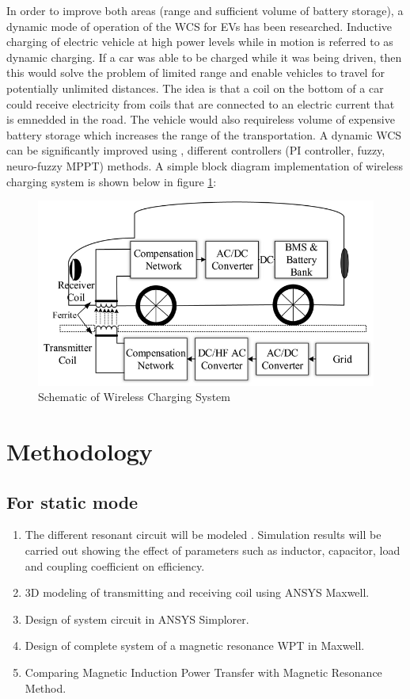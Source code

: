 \documentclass[12pt]{article}
\begin{document}
In order to improve both areas (range and sufficient volume of battery storage), a dynamic mode of operation of the WCS for EVs has been researched. Inductive charging of electric vehicle at high power levels while in motion is referred to as dynamic charging. If a car was able to be charged while it was being driven, then this would solve the problem of limited range and enable vehicles to travel for potentially unlimited distances. The idea is that a coil on the bottom of a car could receive electricity from coils that are connected to an electric current that is emnedded in the road. The vehicle would also requireless volume of expensive battery storage which increases the range of the transportation. A dynamic WCS can be significantly improved using , different controllers (PI controller, fuzzy, neuro-fuzzy MPPT) methods.\cite{knupfer2017electrifying} 
\newpage
A simple block diagram implementation of wireless charging system is shown below in figure \ref{fig:scheme}:
\begin{figure}[h!]
	\centering
	\includegraphics[scale=0.5]{image1.jpg}
	\caption{Schematic of Wireless Charging System}
	\label{fig:scheme}
\end{figure}

\section{Methodology}
\subsection{For static mode}
\begin{enumerate}
	\item The different resonant circuit will be modeled . Simulation results will be carried out showing the effect of parameters such as inductor, capacitor, load and coupling coefficient on efficiency. 
	\item 3D modeling of transmitting and receiving coil using ANSYS Maxwell. 
	\item Design of system circuit in ANSYS Simplorer. 
	\item Design of complete system of a magnetic resonance WPT in Maxwell. 
	\item Comparing Magnetic Induction Power Transfer with Magnetic Resonance Method. 
\end{enumerate}
\end{document}
